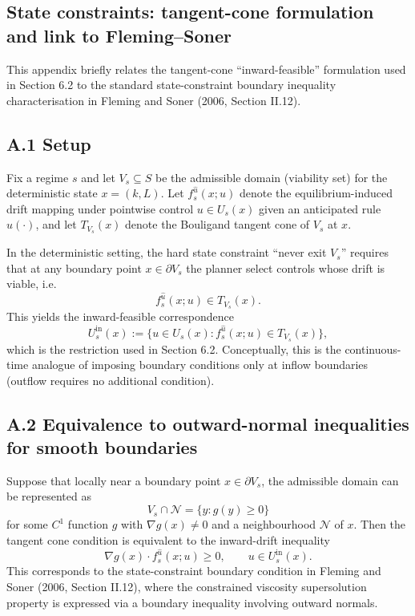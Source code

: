 \begin{appendix}





\appendix
\section{State constraints: tangent-cone formulation and link to Fleming--Soner}

This appendix briefly relates the tangent-cone ``inward-feasible'' formulation used in Section 6.2 to the standard
state-constraint boundary inequality characterisation in Fleming and Soner (2006, Section II.12).

\subsection*{A.1 Setup}
Fix a regime $s$ and let $V_s\subseteq S$ be the admissible domain (viability set) for the deterministic state $x=(k,L)$.
Let $f_s^{\hat u}(x;u)$ denote the equilibrium-induced drift mapping under pointwise control $u\in U_s(x)$ given an anticipated
rule $\hat u(\cdot)$, and let $T_{V_s}(x)$ denote the Bouligand tangent cone of $V_s$ at $x$.

In the deterministic setting, the hard state constraint ``never exit $V_s$'' requires that at any boundary point
$x\in\partial V_s$ the planner select controls whose drift is viable, i.e.
\[
f_s^{\hat u}(x;u)\in T_{V_s}(x).
\]
This yields the inward-feasible correspondence
\[
U^{\mathrm{in}}_s(x):=\{u\in U_s(x): f_s^{\hat u}(x;u)\in T_{V_s}(x)\},
\]
which is the restriction used in Section 6.2. Conceptually, this is the continuous-time analogue of imposing boundary
conditions only at inflow boundaries (outflow requires no additional condition).

\subsection*{A.2 Equivalence to outward-normal inequalities for smooth boundaries}
Suppose that locally near a boundary point $x\in\partial V_s$, the admissible domain can be represented as
\[
V_s\cap \mathcal N = \{y: g(y)\ge 0\}
\]
for some $C^1$ function $g$ with $\nabla g(x)\neq 0$ and a neighbourhood $\mathcal N$ of $x$. Then the tangent cone condition is
equivalent to the inward-drift inequality
\[
\nabla g(x)\cdot f_s^{\hat u}(x;u)\ge 0,\qquad u\in U^{\mathrm{in}}_s(x).
\]
This corresponds to the state-constraint boundary condition in Fleming and Soner (2006, Section II.12), where the constrained
viscosity supersolution property is expressed via a boundary inequality involving outward normals.


\end{appendix}
